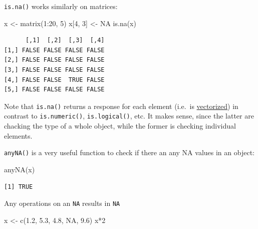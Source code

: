 \documentclass[
]{book}
\makeatletter
\newenvironment{Shaded}{\begin{snugshade}}{\end{snugshade}}
\newcommand{\ConstantTok}[1]{\textcolor[rgb]{0.00,0.00,0.00}{#1}}
\newcommand{\DecValTok}[1]{\textcolor[rgb]{0.00,0.00,0.81}{#1}}
\newcommand{\FloatTok}[1]{\textcolor[rgb]{0.00,0.00,0.81}{#1}}
\newcommand{\FunctionTok}[1]{\textcolor[rgb]{0.00,0.00,0.00}{#1}}
\newcommand{\NormalTok}[1]{#1}
\newcommand{\OtherTok}[1]{\textcolor[rgb]{0.56,0.35,0.01}{#1}}
\newcommand{\SpecialCharTok}[1]{\textcolor[rgb]{0.00,0.00,0.00}{#1}}
\newenvironment{kframe}{%
\medskip{}
\setlength{\fboxsep}{.8em}
 \def\at@end@of@kframe{}%
 \ifinner\ifhmode%
  \def\at@end@of@kframe{\end{minipage}}%
  \begin{minipage}{\columnwidth}%
 \fi\fi%
 \def\FrameCommand##1{\hskip\@totalleftmargin \hskip-\fboxsep
 \colorbox{shadecolor}{##1}\hskip-\fboxsep
     \hskip-\linewidth \hskip-\@totalleftmargin \hskip\columnwidth}%
 \MakeFramed {\advance\hsize-\width
   \@totalleftmargin\z@ \linewidth\hsize
   \@setminipage}}%
 {\par\unskip\endMakeFramed%
 \at@end@of@kframe}
\newenvironment{rmdblock}[1]
  {
  \begin{itemize}
  \renewcommand{\labelitemi}{
    \raisebox{-.7\height}[0pt][0pt]{
      {\setkeys{Gin}{width=3em,keepaspectratio}\texttt{[image: images/\#1]}}
    }
  }
  \setlength{\fboxsep}{1em}
  \begin{kframe}
  \item
  }
  {
  \end{kframe}
  \end{itemize}
  }
\newenvironment{note}
  {\begin{rmdblock}{note}}
  {\end{rmdblock}}
\makeatother
\begin{document}
\texttt{is.na()} works similarly on matrices:

\begin{Shaded}
\begin{Highlighting}[]
\NormalTok{x }\OtherTok{\textless{}{-}} \FunctionTok{matrix}\NormalTok{(}\DecValTok{1}\SpecialCharTok{:}\DecValTok{20}\NormalTok{, }\DecValTok{5}\NormalTok{)}
\NormalTok{x[}\DecValTok{4}\NormalTok{, }\DecValTok{3}\NormalTok{] }\OtherTok{\textless{}{-}} \ConstantTok{NA}
\FunctionTok{is.na}\NormalTok{(x)}
\end{Highlighting}
\end{Shaded}

\begin{verbatim}
      [,1]  [,2]  [,3]  [,4]
[1,] FALSE FALSE FALSE FALSE
[2,] FALSE FALSE FALSE FALSE
[3,] FALSE FALSE FALSE FALSE
[4,] FALSE FALSE  TRUE FALSE
[5,] FALSE FALSE FALSE FALSE
\end{verbatim}

\begin{note}
Note that \texttt{is.na()} returns a response for each element (i.e.~is
\protect\hyperlink{vectorization}{vectorized}) in contrast to
\texttt{is.numeric()}, \texttt{is.logical()}, etc. It makes sense, since
the latter are chacking the type of a whole object, while the former is
checking individual elements.
\end{note}

\texttt{anyNA()} is a very useful function to check if there an any NA values in an object:

\begin{Shaded}
\begin{Highlighting}[]
\FunctionTok{anyNA}\NormalTok{(x)}
\end{Highlighting}
\end{Shaded}

\begin{verbatim}
[1] TRUE
\end{verbatim}

\begin{note}
Any operations on an \texttt{NA} results in \texttt{NA}
\end{note}

\begin{Shaded}
\begin{Highlighting}[]
\NormalTok{x }\OtherTok{\textless{}{-}} \FunctionTok{c}\NormalTok{(}\FloatTok{1.2}\NormalTok{, }\FloatTok{5.3}\NormalTok{, }\FloatTok{4.8}\NormalTok{, }\ConstantTok{NA}\NormalTok{, }\FloatTok{9.6}\NormalTok{)}
\NormalTok{x}\SpecialCharTok{*}\DecValTok{2}
\end{Highlighting}
\end{Shaded}
\end{document}
